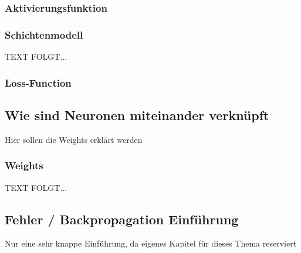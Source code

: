 \subsubsection{Aktivierungsfunktion}\label{subsec:neuronen:aktivierungsfunktion}
   


\newpage
\subsubsection{Schichtenmodell}\label{subsec:neuronen:schichtenmodell}
  TEXT FOLGT... 

\subsubsection{Loss-Function}

\newpage 
\subsection{Wie sind Neuronen miteinander verknüpft}\label{subsec:neuronen:verknuepfung_neuronen}  
%
Hier sollen die Weights erklärt werden

\subsubsection{Weights}\label{Weights}
  TEXT FOLGT... 

\subsection{Fehler / Backpropagation Einführung}\label{subsec:neuronen:fehler_backpropagation}
Nur eine sehr knappe Einführung, da eigenes Kapitel für dieses Thema reserviert

